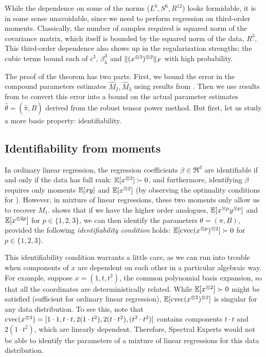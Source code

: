 While the dependence on some of the norms ($L^6,S^6,R^{12}$) looks formidable,
it is in some sense unavoidable, since we
need to perform regression on third-order moments.
Classically, the number of samples required is squared norm of the covariance matrix,
which itself is bounded by the squared norm of the data, $R^3$. This
third-order dependence also shows up in the regularization strengths;
the cubic terms bound each of $\epsilon^3$,
$\beta_h^3$ and $\|(x^{\otimes 3})^{\otimes 2}\|_F$ with high probability. 

The proof of the theorem has two parts.
First, we bound the error in the compound parameters estimates $\hat M_2,\hat M_3$
using results from \citet{Tomioka2011}.
Then we use results from \citet{AnandkumarGeHsu2012} to convert this error
into a bound on the actual parameter estimates $\hat\theta = (\hat\pi, \hat B)$
derived from the robust tensor power method.
But first, let us study a more basic property: identifiability.


\subsection{Identifiability from moments}

In ordinary linear regression, the regression coefficients $\beta \in
\Re^d$ are identifiable if and only if the data has full rank:
$\operatorname{\mathbb{E}}[x^{\otimes 2}] \succ 0$, and furthermore, identifying $\beta$ requires
only moments $\operatorname{\mathbb{E}}[xy]$ and $\operatorname{\mathbb{E}}[x^{\otimes 2}]$ (by observing the optimality
conditions for ).  However, in mixture of linear regressions,
these two moments only allow us to recover $M_1$.  
shows that if we have the higher order analogues, $\operatorname{\mathbb{E}}[x^{\otimes p}y^{\otimes p}]$
and $\operatorname{\mathbb{E}}[x^{\otimes 2p}]$ for $p \in \{1,2,3\}$, we can then identify the
parameters $\theta = (\pi, B)$,
provided the following \emph{identifiability condition} holds: $\operatorname{\mathbb{E}}[\operatorname{cvec}(x^{\otimes p})^{\otimes 2}] \succ
0$ for $p \in \{1,2,3\}$.

This identifiability condition warrants a little care,
as we can run into trouble when components of $x$ are dependent on each other
in a particular algebraic way.
For example, suppose $x = (1, t, t^2)$, the common polynomial
basis expansion, so that all the coordinates are deterministically
related.  While $\operatorname{\mathbb{E}}[x^{\otimes 2}] \succ 0$ might be satisfied (sufficient for ordinary linear regression),
$\operatorname{\mathbb{E}}[\operatorname{cvec}(x^{\otimes 2})^{\otimes 2}]$ is singular for
any data distribution.
To see this, note that $\operatorname{cvec}(x^{\otimes 2}) = [1 \cdot 1, t\cdot t, 2(1
\cdot t^2), 2(t \cdot t^2), (t^2 \cdot t^2)]$ contains components $t
\cdot t$ and $2(1 \cdot t^2)$, which are linearly dependent.  Therefore,
Spectral Experts would not be able to identify the parameters of
a mixture of linear regressions for this data distribution.

